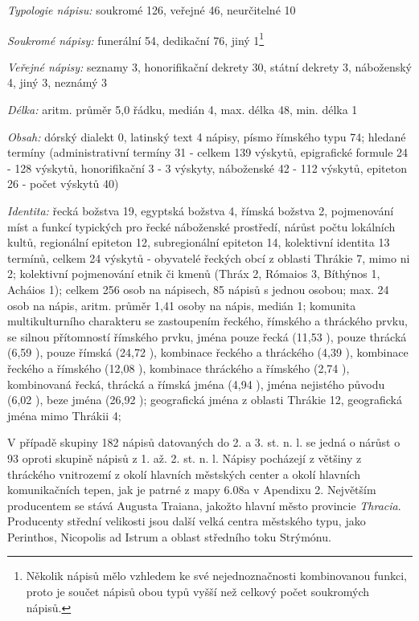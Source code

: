 {\em Typologie nápisu:} soukromé 126, veřejné 46, neurčitelné 10

{\em Soukromé nápisy:} funerální 54, dedikační 76, jiný 1\footnote{Několik nápisů mělo vzhledem ke své nejednoznačnosti kombinovanou funkci, proto je součet nápisů obou typů vyšší než celkový počet soukromých nápisů.}

{\em Veřejné nápisy:} seznamy 3, honorifikační dekrety 30, státní dekrety 3, náboženský 4, jiný 3, neznámý 3

{\em Délka:} aritm. průměr 5,0 řádku, medián 4, max. délka 48, min. délka 1

{\em Obsah:} dórský dialekt 0, latinský text 4 nápisy, písmo římského typu 74; hledané termíny (administrativní termíny 31 - celkem 139 výskytů, epigrafické formule 24 - 128 výskytů, honorifikační 3 - 3 výskyty, náboženské 42 - 112 výskytů, epiteton 26 - počet výskytů 40)

{\em Identita:} řecká božstva 19, egyptská božstva 4, římská božstva 2, pojmenování míst a funkcí typických pro řecké náboženské prostředí, nárůst počtu lokálních kultů, regionální epiteton 12, subregionální epiteton 14, kolektivní identita 13 termínů, celkem 24 výskytů - obyvatelé řeckých obcí z oblasti Thrákie 7, mimo ni 2; kolektivní pojmenování etnik či kmenů (Thráx 2, Rómaios 3, Bíthýnos 1, Acháios 1); celkem 256 osob na nápisech, 85 nápisů s jednou osobou; max. 24 osob na nápis, aritm. průměr 1,41 osoby na nápis, medián 1; komunita multikulturního charakteru se zastoupením řeckého, římského a thráckého prvku, se silnou přítomností římského prvku, jména pouze řecká (11,53 ), pouze thrácká (6,59 ), pouze římská (24,72 ), kombinace řeckého a thráckého (4,39 ), kombinace řeckého a římského (12,08 ), kombinace thráckého a římského (2,74 ), kombinovaná řecká, thrácká a římská jména (4,94 ), jména nejistého původu (6,02 ), beze jména (26,92 ); geografická jména z oblasti Thrákie 12, geografická jména mimo Thrákii 4;

\NC\AR
\HL
\HL
\stoptable

V případě skupiny 182 nápisů datovaných do 2. a 3. st. n. l. se jedná o nárůst o 93  oproti skupině nápisů z 1. až. 2. st. n. l. Nápisy pocházejí z většiny z thráckého vnitrozemí z okolí hlavních městských center a okolí hlavních komunikačních tepen, jak je patrné z mapy 6.08a v Apendixu 2. Největším producentem se stává Augusta Traiana, jakožto hlavní město provincie {\em Thracia}. Producenty střední velikosti jsou další velká centra městského typu, jako Perinthos, Nicopolis ad Istrum a oblast středního toku Strýmónu.

